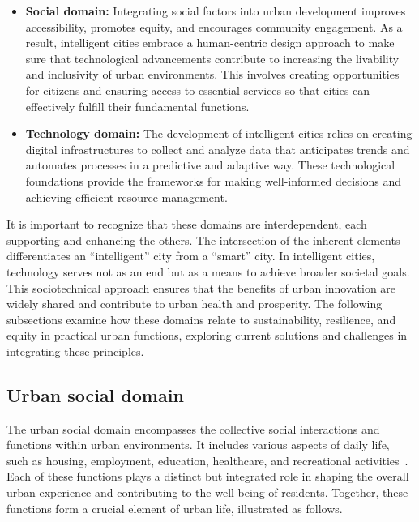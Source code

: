 \documentclass[smartcities,article,submit,pdftex,moreauthors]{Definitions/mdpi}
\begin{document}
\begin{itemize}
    \item \textbf{Social domain:} Integrating social factors into urban development improves accessibility, promotes equity, and encourages community engagement. As a result, intelligent cities embrace a human-centric design approach to make sure that technological advancements contribute to increasing the livability and inclusivity of urban environments. This involves creating opportunities for citizens and ensuring access to essential services so that cities can effectively fulfill their fundamental functions.

    \item \textbf{Technology domain:} The development of intelligent cities relies on creating digital infrastructures to collect and analyze data that anticipates trends and automates processes in a predictive and adaptive way. These technological foundations provide the frameworks for making well-informed decisions and achieving efficient resource management.
\end{itemize}

It is important to recognize that these domains are interdependent, each supporting and enhancing the others. The intersection of the inherent elements differentiates an ``intelligent'' city from a ``smart'' city. In intelligent cities, technology serves not as an end but as a means to achieve broader societal goals. This sociotechnical approach ensures that the benefits of urban innovation are widely shared and contribute to urban health and prosperity. The following subsections examine how these domains relate to sustainability, resilience, and equity in practical urban functions, exploring current solutions and challenges in integrating these principles.

\subsection{Urban social domain}
The urban social domain encompasses the collective social interactions and functions within urban environments. It includes various aspects of daily life, such as housing, employment, education, healthcare, and recreational activities~\cite{carlosmoreno15}. Each of these functions plays a distinct but integrated role in shaping the overall urban experience and contributing to the well-being of residents. Together, these functions form a crucial element of urban life, illustrated as follows. 
\end{document}
